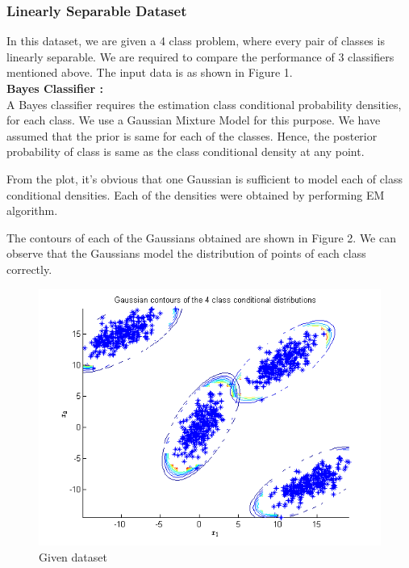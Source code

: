 \documentclass{article}
\begin{document}
\subsubsection{Linearly Separable Dataset}
\begin{flushleft}
In this dataset, we are given a 4 class problem, where every pair of classes is linearly separable. We are required to compare the performance of 3 classifiers mentioned above.
The input data is as shown in Figure 1. \\[10pt]

\textbf{Bayes Classifier :}  \\[10pt]

A Bayes classifier requires the estimation class conditional probability densities, for each class. We use a Gaussian Mixture Model for this purpose. We have assumed that the prior is same for each of the classes. Hence, the posterior probability of class is same as the class conditional density at any point.


From the plot, it's obvious that one Gaussian is sufficient to model each of class conditional densities.
Each of the densities were obtained by performing EM algorithm. 


The contours of each of the Gaussians obtained are shown in Figure 2. We can observe that the Gaussians model the distribution of points of each class correctly.



\begin{figure}[H]
\centering
\includegraphics[width=\linewidth]{Classification/linearlySeparable/contours.png}
\caption{Given dataset}
\end{figure}


\end{flushleft}
\end{document}
